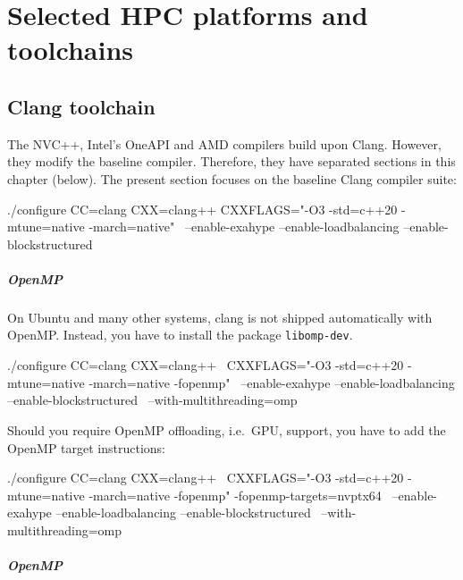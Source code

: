 \chapter{Selected HPC platforms and toolchains}
\label{chapter:selected-HPC-platforms}


\section{Clang toolchain}

 The NVC++, Intel's OneAPI and AMD compilers build upon Clang. However, they modify
 the baseline compiler. Therefore, they have separated sections in this chapter
 (below).
 The present section focuses on the baseline Clang compiler suite:

\begin{bash}
./configure CC=clang CXX=clang++ CXXFLAGS="-O3 -std=c++20 -mtune=native -march=native" \
 --enable-exahype --enable-loadbalancing --enable-blockstructured
\end{bash}


\paragraph{OpenMP}

\begin{remark}
 On Ubuntu and many other systems, clang is not shipped automatically with
 OpenMP. Instead, you have to install the package \texttt{libomp-dev}.
\end{remark}

\begin{bash}
./configure CC=clang CXX=clang++ \
 CXXFLAGS="-O3 -std=c++20 -mtune=native -march=native -fopenmp" \
 --enable-exahype --enable-loadbalancing --enable-blockstructured \
 --with-multithreading=omp 
\end{bash}

Should you require OpenMP offloading, i.e.~GPU, support, you have to add the
OpenMP target instructions:

\begin{bash}
./configure CC=clang CXX=clang++ \
 CXXFLAGS="-O3 -std=c++20 -mtune=native -march=native -fopenmp" -fopenmp-targets=nvptx64 \
 --enable-exahype --enable-loadbalancing --enable-blockstructured \
 --with-multithreading=omp 
\end{bash}




\paragraph{OpenMP}
\label{section:supercomputers:openmp}

